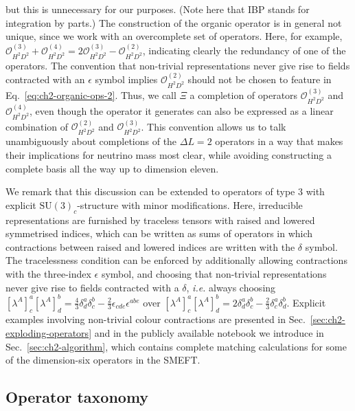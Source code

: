 but this is unnecessary for our purposes. (Note here that IBP stands for
integration by parts.) The construction of the organic operator is in general
not unique, since we work with an overcomplete set of operators. Here, for
example,
$\mathcal{O}_{H^{2}D^{2}}^{(3)} + \mathcal{O}_{H^{2}D^{2}}^{(4)} = 2\mathcal{O}_{H^{2}D^{2}}^{(3)} - \mathcal{O}_{H^{2}D^{2}}^{(2)}$,
indicating clearly the redundancy of one of the operators. The convention that
non-trivial representations never give rise to fields contracted with an
$\epsilon$ symbol implies $\mathcal{O}^{(2)}_{H^{2}D^{2}}$ should not be chosen
to feature in Eq.~\eqref{eq:ch2-organic-ops-2}. Thus, we call $\Xi$ a completion of
operators $\mathcal{O}_{H^{2}D^{2}}^{(3)}$ and $\mathcal{O}_{H^{2}D^{2}}^{(4)}$,
even though the operator it generates can also be expressed as a linear
combination of $\mathcal{O}^{(2)}_{H^{2}D^{2}}$ and
$\mathcal{O}^{(3)}_{H^{2}D^{2}}$. This convention allows us to talk
unambiguously about completions of the $\Delta L = 2$ operators in a way that
makes their implications for neutrino mass most clear, while avoiding
constructing a complete basis all the way up to dimension eleven.

We remark that this discussion can be extended to operators of type 3 with
explicit $\mathrm{SU}(3)_{c}$-structure with minor modifications. Here,
irreducible representations are furnished by traceless tensors with raised and
lowered symmetrised indices, which can be written as sums of operators in which
contractions between raised and lowered indices are written with the $\delta$
symbol. The tracelessness condition can be enforced by additionally allowing
contractions with the three-index $\epsilon$ symbol, and choosing that
non-trivial representations never give rise to fields contracted with a
$\delta$, \textit{i.e.} always choosing
$[\lambda^{A}]_{c}^{a} [\lambda^{A}]_{d}^{b} = \tfrac{4}{3}\delta^{a}_{d}\delta^{b}_{c} - \tfrac{2}{3}\epsilon_{cde}\epsilon^{abe}$
over
$[\lambda^{A}]_{c}^{a} [\lambda^{A}]_{d}^{b} = 2\delta^{a}_{d}\delta^{b}_{c} - \tfrac{2}{3}\delta^{a}_{c}\delta^{b}_{d}$.
Explicit examples involving non-trivial colour contractions are presented in
Sec.~\ref{sec:ch2-exploding-operators} and in the publicly available notebook we
introduce in Sec.~\ref{sec:ch2-algorithm}, which contains complete matching
calculations for some of the dimension-six operators in the SMEFT.

\subsection{Operator taxonomy}
\label{sec:ch2-operatortaxonomy}


